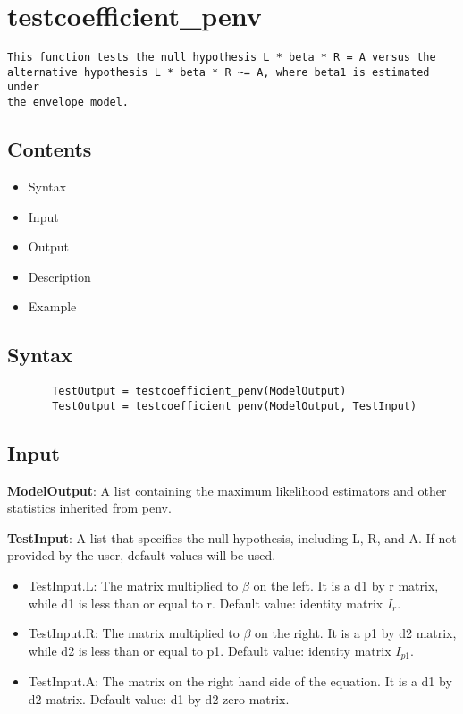 \documentclass[a4paper,11pt,openany]{memoir}
\begin{document}
\newpage

\rmfamily
\color{black}\section{testcoefficient\_penv}


\begin{verbatim}This function tests the null hypothesis L * beta * R = A versus the
alternative hypothesis L * beta * R ~= A, where beta1 is estimated under
the envelope model.\end{verbatim}
    
\subsection*{Contents}

\begin{itemize}
\setlength{\itemsep}{-1ex}
   \item Syntax
   \item Input
   \item Output
   \item Description
   \item Example
\end{itemize}


\subsection*{Syntax}


\begin{verbatim}       TestOutput = testcoefficient_penv(ModelOutput)
       TestOutput = testcoefficient_penv(ModelOutput, TestInput)\end{verbatim}
    

\subsection*{Input}

\begin{par}
\textbf{ModelOutput}: A list containing the maximum likelihood estimators and other statistics inherited from penv.
\end{par} \vspace{1em}
\begin{par}
\textbf{TestInput}: A list that specifies the null hypothesis, including L, R, and A.  If not provided by the user, default values will be used.
\end{par} \vspace{1em}
\begin{itemize}
\setlength{\itemsep}{-1ex}
   \item TestInput.L: The matrix multiplied to $\beta$ on the left.  It is a d1 by r matrix, while d1 is less than or equal to r.  Default value: identity matrix $I_r$.
   \item TestInput.R: The matrix multiplied to $\beta$ on the right.  It is a p1 by d2 matrix, while d2 is less than or equal to p1.  Default value: identity matrix $I_{p1}$.
   \item TestInput.A: The matrix on the right hand side of the equation.  It is a d1 by d2 matrix.  Default value: d1 by d2 zero matrix.
\end{itemize}
\end{document}
